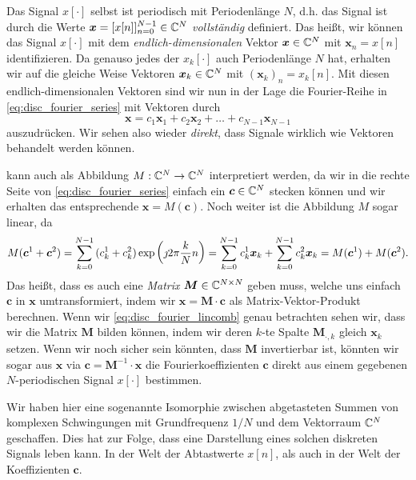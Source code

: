Das Signal $x[\cdot]$ selbst ist periodisch mit Periodenlänge $N$, d.h. das Signal ist durch die Werte $\bm x = [x[n]]_{n=0}^{N-1} \in \mathbb{C}^N$ \emph{vollständig} definiert. 
Das heißt, wir können das Signal $x[\cdot]$ mit dem \emph{endlich-dimensionalen} Vektor $\bm x \in \mathbb{C}^N$ mit $\bm x_n = x[n]$ identifizieren.
Da genauso jedes der $x_k[\cdot]$ auch Periodenlänge $N$ hat, erhalten wir auf die gleiche Weise Vektoren $\bm x_k \in \mathbb{C}^N$ mit $(\bm x_k)_n = x_k[n]$.
Mit diesen endlich-dimensionalen Vektoren sind wir nun in der Lage die Fourier-Reihe in \eqref{eq:disc_fourier_series} mit  Vektoren durch
%
\begin{equation}\label{eq:disc_fourier_lincomb}
    \bm x = c_1 \bm x_1 + c_2 \bm x_2 + \ldots + c_{N-1} \bm x_{N-1}
\end{equation}
%
auszudrücken.
Wir sehen also wieder \emph{direkt}, dass Signale wirklich wie Vektoren behandelt werden können.

 kann auch als Abbildung $M : \mathbb{C}^N \rightarrow \mathbb{C}^N$ interpretiert werden, da wir in die rechte Seite von \eqref{eq:disc_fourier_series} einfach ein $\bm c \in \mathbb{C}^N$ stecken können und wir erhalten das entsprechende $\bm x = M(\bm c)$.
Noch weiter ist die Abbildung $M$ sogar linear, da 
\[
    M(\bm c^1 + \bm c^2)
        =  {\sum\limits_{k = 0}^{N-1}{
            (c^1_k + c^2_k) \exp\left(
                \jmath 2 \pi \frac{k}{N} n
            \right) 
        }}
        =  {\sum\limits_{k = 0}^{N-1}{
            c^1_k \bm x_k
        }}
        + {\sum\limits_{k = 0}^{N-1}{
            c^2_k \bm x_k 
        }}
        = M(\bm c^1) + M(\bm c^2).
\]
Das heißt, dass es auch eine \emph{Matrix} $\bm M \in \mathbb{C}^{N \times N}$ geben muss, welche uns einfach $\bm c$ in $\bm x$ umtransformiert, indem wir $\bm x = \bm M \cdot \bm c$ als Matrix-Vektor-Produkt berechnen.
Wenn wir \eqref{eq:disc_fourier_lincomb} genau betrachten sehen wir, dass wir die Matrix $\bm M$ bilden können, indem wir deren $k$-te Spalte $\bm M_{\cdot, k}$ gleich $\bm x_k$ setzen.
Wenn wir noch sicher sein könnten, dass $\bm M$ invertierbar ist, könnten wir sogar aus $\bm x$ via $\bm c = \bm M^{-1} \cdot \bm x$ die Fourierkoeffizienten $\bm c$ direkt aus einem gegebenen $N$-periodischen Signal $x[\cdot]$ bestimmen.

Wir haben hier eine sogenannte Isomorphie zwischen abgetasteten Summen von komplexen Schwingungen mit Grundfrequenz $1/N$ und dem Vektorraum $\mathbb{C}^N$ geschaffen.
Dies hat zur Folge, dass eine Darstellung eines solchen diskreten Signals  leben kann. 
In der Welt der Abtastwerte $x[n]$, als auch in der Welt der Koeffizienten $\bm c$.
%
%
%
